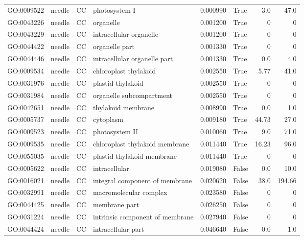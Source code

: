 \begin{longtable}{llllrlrr}
GO:0009522 & needle & CC &   photosystem I  & 0.000990 &   True  & 3.0 & 47.0 \\ 
GO:0043226 & needle & CC &   organelle  & 0.001200 &   True  & 0 & 0 \\
GO:0043229 & needle & CC &   intracellular organelle  & 0.001200 &   True  & 0 & 0 \\
GO:0044422 & needle & CC &   organelle part  & 0.001330 &   True  & 0 & 0 \\
GO:0044446 & needle & CC &   intracellular organelle part  & 0.001330 &   True  & 0.0 & 4.0 \\ 
GO:0009534 & needle & CC &   chloroplast thylakoid  & 0.002550 &   True  & 5.77 & 41.0 \\ 
GO:0031976 & needle & CC &   plastid thylakoid  & 0.002550 &   True  & 0 & 0 \\
GO:0031984 & needle & CC &   organelle subcompartment  & 0.002550 &   True  & 0 & 0 \\
GO:0042651 & needle & CC &   thylakoid membrane  & 0.008990 &   True  & 0.0 & 1.0 \\ 
GO:0005737 & needle & CC &   cytoplasm  & 0.009180 &   True  & 44.73 & 27.0 \\ 
GO:0009523 & needle & CC &   photosystem II  & 0.010060 &   True  & 9.0 & 71.0 \\ 
GO:0009535 & needle & CC &   chloroplast thylakoid membrane  & 0.011440 &   True  & 16.23 & 96.0 \\ 
GO:0055035 & needle & CC &   plastid thylakoid membrane  & 0.011440 &   True  & 0 & 0 \\
GO:0005622 & needle & CC &   intracellular  & 0.019080 &   False  & 0.0 & 10.0 \\ 
GO:0016021 & needle & CC &   integral component of membrane  & 0.020620 &   False  & 38.0 & 194.66 \\ 
GO:0032991 & needle & CC &   macromolecular complex  & 0.023580 &   False  & 0 & 0 \\
GO:0044425 & needle & CC &   membrane part  & 0.026250 &   False  & 0 & 0 \\
GO:0031224 & needle & CC &   intrinsic component of membrane  & 0.027940 &   False  & 0 & 0 \\
GO:0044424 & needle & CC &   intracellular part  & 0.046640 &   False  & 0.0 & 1.0 \\ 
\bottomrule
\end{longtable}

